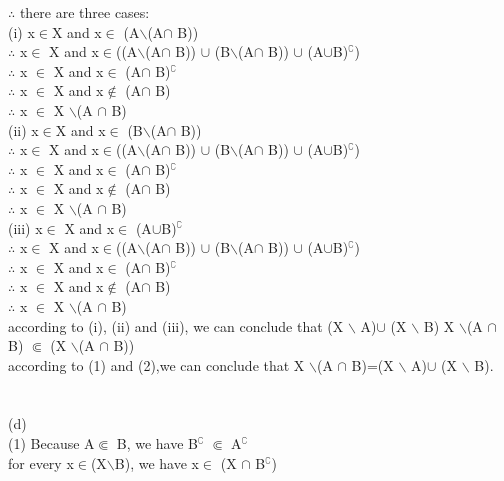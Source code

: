 \documentclass[11pt, a4paper, UTF8]{ctexart}
\begin{document}
\begin{solution}
$\therefore$ there are three cases:\\
\indent (i) x$\in$X and x$\in$ (A$\backslash$(A$\cap$ B))\\
\indent \indent $\therefore$ x$\in$ X and x$\in$((A$\backslash$(A$\cap$ B)) $\cup$ (B$\backslash$(A$\cap$ B)) $\cup$ (A$\cup$B)$^\complement$)\\
\indent \indent $\therefore$ x $\in$ X and x$\in$ (A$\cap$ B)$^\complement$\\
\indent \indent $\therefore$ x $\in$ X and x$\notin$ (A$\cap$ B)\\
\indent \indent $\therefore$ x $\in$ X $\backslash$(A $\cap$ B)\\
\indent (ii) x$\in$X and x$\in$ (B$\backslash$(A$\cap$ B))\\
\indent \indent $\therefore$ x$\in$ X and x$\in$((A$\backslash$(A$\cap$ B)) $\cup$ (B$\backslash$(A$\cap$ B)) $\cup$ (A$\cup$B)$^\complement$)\\
\indent \indent $\therefore$ x $\in$ X and x$\in$ (A$\cap$ B)$^\complement$\\
\indent \indent $\therefore$ x $\in$ X and x$\notin$ (A$\cap$ B)\\
\indent \indent $\therefore$ x $\in$ X $\backslash$(A $\cap$ B)\\
\indent (iii) x$\in$ X and x$\in$ (A$\cup$B)$^\complement$\\
\indent \indent $\therefore$ x$\in$ X and x$\in$((A$\backslash$(A$\cap$ B)) $\cup$ (B$\backslash$(A$\cap$ B)) $\cup$ (A$\cup$B)$^\complement$)\\
\indent \indent $\therefore$ x $\in$ X and x$\in$ (A$\cap$ B)$^\complement$\\
\indent \indent $\therefore$ x $\in$ X and x$\notin$ (A$\cap$ B)\\
\indent \indent $\therefore$ x $\in$ X $\backslash$(A $\cap$ B)\\
according to (i), (ii) and (iii), we can conclude that (X $\backslash$ A)$\cup$ (X $\backslash$ B) X $\backslash$(A $\cap$ B) $\Subset$ (X $\backslash$(A $\cap$ B))\\
according to (1) and (2),we can conclude that X $\backslash$(A $\cap$ B)=(X $\backslash$ A)$\cup$ (X $\backslash$ B).\\
\\
\\
(d)\\
(1) Because A$\Subset$ B, we have B$^\complement$ $\Subset$ A$^\complement$\\
for every x$\in$(X$\backslash$B), we have x$\in$ (X $\cap$ B$^\complement$)\\

\end{solution}
\end{document}

